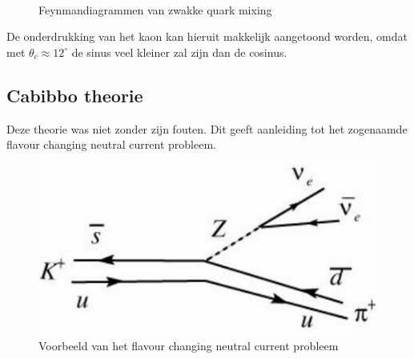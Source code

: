 \documentclass[../main.tex]{subfiles}
\begin{document}
\begin{figure}[h]
    \centering
    \\
    \caption{Feynmandiagrammen van zwakke quark mixing}
\end{figure}

De onderdrukking van het kaon kan hieruit makkelijk aangetoond worden, omdat met $\theta_c \approx 12^\circ$ de sinus veel kleiner zal zijn dan de cosinus.

\subsection{Cabibbo theorie}%
\label{sub:cabbibo_theorie}

Deze theorie was niet zonder zijn fouten. Dit geeft aanleiding tot het zogenaamde flavour changing neutral current probleem.

\begin{figure}[h]
    \centering
    \includegraphics[width=0.5\linewidth]{meson_mixing_and_oscillations/flav_ch_problem.png}
    \caption{Voorbeeld van het flavour changing neutral current probleem}%
    \label{fig:meson_mixing_and_oscillations/flav_ch_problem}
\end{figure}
\end{document}
